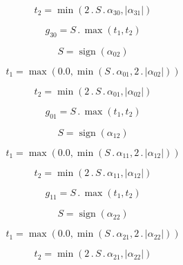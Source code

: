 \documentclass{article}
\begin{document}
\begin{dmath}t_{2} = \min\left(2 \,.\, S \,.\, \alpha_{30}, \left|{\alpha_{31}}\right|\right)\end{dmath}

\begin{dmath}g_{30} = S \,.\, \max\left(t_{1}, t_{2}\right)\end{dmath}

\begin{dmath}S = \operatorname{sign}{\left (\alpha_{02} \right )}\end{dmath}

\begin{dmath}t_{1} = \max\left(0.0, \min\left(S \,.\, \alpha_{01}, 2 \,.\, \left|{\alpha_{02}}\right|\right)\right)\end{dmath}

\begin{dmath}t_{2} = \min\left(2 \,.\, S \,.\, \alpha_{01}, \left|{\alpha_{02}}\right|\right)\end{dmath}

\begin{dmath}g_{01} = S \,.\, \max\left(t_{1}, t_{2}\right)\end{dmath}

\begin{dmath}S = \operatorname{sign}{\left (\alpha_{12} \right )}\end{dmath}

\begin{dmath}t_{1} = \max\left(0.0, \min\left(S \,.\, \alpha_{11}, 2 \,.\, \left|{\alpha_{12}}\right|\right)\right)\end{dmath}

\begin{dmath}t_{2} = \min\left(2 \,.\, S \,.\, \alpha_{11}, \left|{\alpha_{12}}\right|\right)\end{dmath}

\begin{dmath}g_{11} = S \,.\, \max\left(t_{1}, t_{2}\right)\end{dmath}

\begin{dmath}S = \operatorname{sign}{\left (\alpha_{22} \right )}\end{dmath}

\begin{dmath}t_{1} = \max\left(0.0, \min\left(S \,.\, \alpha_{21}, 2 \,.\, \left|{\alpha_{22}}\right|\right)\right)\end{dmath}

\begin{dmath}t_{2} = \min\left(2 \,.\, S \,.\, \alpha_{21}, \left|{\alpha_{22}}\right|\right)\end{dmath}
\end{document}
